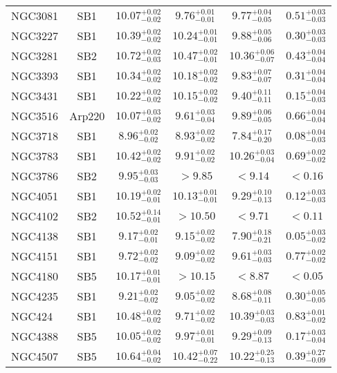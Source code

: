 \documentclass[onecolumn]{mn2e}
\begin{document}
{\begin{center}
\begin{longtable}{lccccc}
NGC3081 & SB1 & $10.07_{-0.02}^{+0.02}$ & $9.76_{-0.01}^{+0.01}$ & $9.77_{-0.05}^{+0.04}$ &$0.51_{-0.03}^{+0.03}$ \\
NGC3227 & SB1 & $10.39_{-0.02}^{+0.02}$ & $10.24_{-0.01}^{+0.01}$ & $9.88_{-0.06}^{+0.05}$ &$0.30_{-0.03}^{+0.03}$ \\
NGC3281 & SB2 & $10.72_{-0.03}^{+0.02}$ & $10.47_{-0.01}^{+0.02}$ & $10.36_{-0.07}^{+0.06}$ &$0.43_{-0.04}^{+0.04}$ \\
NGC3393 & SB1 & $10.34_{-0.02}^{+0.02}$ & $10.18_{-0.02}^{+0.02}$ & $9.83_{-0.07}^{+0.07}$ &$0.31_{-0.04}^{+0.04}$ \\
NGC3431 & SB1 & $10.22_{-0.02}^{+0.02}$ & $10.15_{-0.02}^{+0.02}$ & $9.40_{-0.11}^{+0.11}$ &$0.15_{-0.03}^{+0.04}$ \\
NGC3516 & Arp220 & $10.07_{-0.02}^{+0.03}$ & $9.61_{-0.04}^{+0.03}$ & $9.89_{-0.05}^{+0.06}$ &$0.66_{-0.04}^{+0.04}$ \\
NGC3718 & SB1 & $8.96_{-0.02}^{+0.02}$ & $8.93_{-0.02}^{+0.02}$ & $7.84_{-0.20}^{+0.17}$ &$0.08_{-0.03}^{+0.04}$ \\
NGC3783 & SB1 & $10.42_{-0.02}^{+0.02}$ & $9.91_{-0.02}^{+0.02}$ & $10.26_{-0.04}^{+0.03}$ &$0.69_{-0.02}^{+0.02}$ \\
NGC3786 & SB2 & $9.95_{-0.03}^{+0.03}$ & $>9.85$ & $<9.14$ &$<0.16$ \\
NGC4051 & SB1 & $10.19_{-0.01}^{+0.02}$ & $10.13_{-0.01}^{+0.01}$ & $9.29_{-0.13}^{+0.10}$ &$0.12_{-0.03}^{+0.03}$ \\
NGC4102 & SB2 & $10.52_{-0.01}^{+0.14}$ & $>10.50$ & $<9.71$ &$<0.11$ \\
NGC4138 & SB1 & $9.17_{-0.01}^{+0.02}$ & $9.15_{-0.02}^{+0.02}$ & $7.90_{-0.21}^{+0.18}$ &$0.05_{-0.02}^{+0.03}$ \\
NGC4151 & SB1 & $9.72_{-0.02}^{+0.02}$ & $9.09_{-0.02}^{+0.02}$ & $9.61_{-0.03}^{+0.03}$ &$0.77_{-0.02}^{+0.02}$ \\
NGC4180 & SB5 & $10.17_{-0.01}^{+0.01}$ & $>10.15$ & $<8.87$ &$<0.05$ \\
NGC4235 & SB1 & $9.21_{-0.02}^{+0.02}$ & $9.05_{-0.02}^{+0.02}$ & $8.68_{-0.11}^{+0.08}$ &$0.30_{-0.05}^{+0.05}$ \\
NGC424 & SB1 & $10.48_{-0.02}^{+0.02}$ & $9.71_{-0.02}^{+0.02}$ & $10.39_{-0.03}^{+0.03}$ &$0.83_{-0.02}^{+0.01}$ \\
NGC4388 & SB5 & $10.05_{-0.02}^{+0.02}$ & $9.97_{-0.01}^{+0.01}$ & $9.29_{-0.13}^{+0.09}$ &$0.17_{-0.04}^{+0.03}$ \\
NGC4507 & SB5 & $10.64_{-0.02}^{+0.04}$ & $10.42_{-0.22}^{+0.07}$ & $10.22_{-0.13}^{+0.25}$ &$0.39_{-0.09}^{+0.27}$ \\

\end{longtable}
\end{center}}
\end{document}
